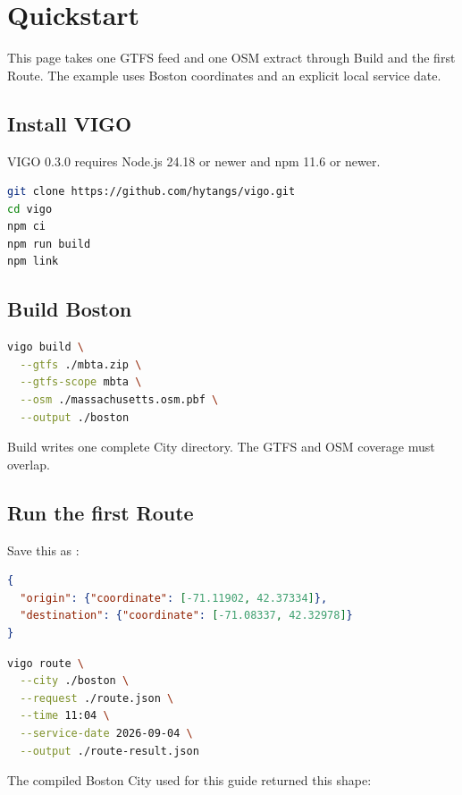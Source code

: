 \documentclass[10pt,letterpaper]{article}
\begin{document}
\guideheader

\section{Quickstart}

This page takes one GTFS feed and one OSM extract through Build and the first Route. The example uses Boston coordinates and an explicit local service date.

\subsection{Install VIGO}

VIGO 0.3.0 requires Node.js 24.18 or newer and npm 11.6 or newer.

\begin{lstlisting}[language=bash]
git clone https://github.com/hytangs/vigo.git
cd vigo
npm ci
npm run build
npm link
\end{lstlisting}

\subsection{Build Boston}

\begin{lstlisting}[language=bash]
vigo build \
  --gtfs ./mbta.zip \
  --gtfs-scope mbta \
  --osm ./massachusetts.osm.pbf \
  --output ./boston
\end{lstlisting}

Build writes one complete City directory. The GTFS and OSM coverage must overlap.

\subsection{Run the first Route}

Save this as \code{route.json}:

\begin{lstlisting}[language=json]
{
  "origin": {"coordinate": [-71.11902, 42.37334]},
  "destination": {"coordinate": [-71.08337, 42.32978]}
}
\end{lstlisting}

\begin{lstlisting}[language=bash]
vigo route \
  --city ./boston \
  --request ./route.json \
  --time 11:04 \
  --service-date 2026-09-04 \
  --output ./route-result.json
\end{lstlisting}

The compiled Boston City used for this guide returned this shape:
\end{document}
